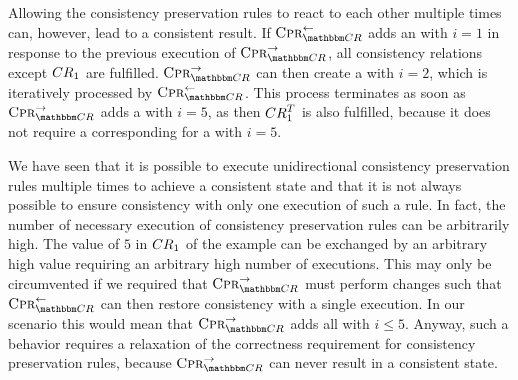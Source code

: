 Allowing the consistency preservation rules to react to each other multiple times can, however, lead to a consistent result.
If $\consistencypreservationrule{\consistencyrelationset{CR}}^{\leftarrow}$ adds an  with $i = 1$ in response to the previous execution of $\consistencypreservationrule{\consistencyrelationset{CR}}^{\rightarrow}$, all consistency relations except $\consistencyrelation{CR}{1}$ are fulfilled.
$\consistencypreservationrule{\consistencyrelationset{CR}}^{\rightarrow}$ can then create a  with $i = 2$, which is iteratively processed by $\consistencypreservationrule{\consistencyrelationset{CR}}^{\leftarrow}$.
This process terminates as soon as $\consistencypreservationrule{\consistencyrelationset{CR}}^{\rightarrow}$ adds a  with $i = 5$, as then $\consistencyrelation{CR}{1}^T$ is also fulfilled, because it does not require a corresponding  for a  with $i = 5$.

We have seen that it is possible to execute unidirectional consistency preservation rules multiple times to achieve a consistent state and that it is not always possible to ensure consistency with only one execution of such a rule.
In fact, the number of necessary execution of consistency preservation rules can be arbitrarily high.
The value of $5$ in $\consistencyrelation{CR}{1}$ of the example can be exchanged by an arbitrary high value requiring an arbitrary high number of executions.
This may only be circumvented if we required that $\consistencypreservationrule{\consistencyrelationset{CR}}^{\rightarrow}$ must perform changes such that $\consistencypreservationrule{\consistencyrelationset{CR}}^{\leftarrow}$ can then restore consistency with a single execution.
In our scenario this would mean that $\consistencypreservationrule{\consistencyrelationset{CR}}^{\rightarrow}$ adds all  with $i \leq 5$.
Anyway, such a behavior requires a relaxation of the correctness requirement for consistency preservation rules, because $\consistencypreservationrule{\consistencyrelationset{CR}}^{\rightarrow}$ can never result in a consistent state.


